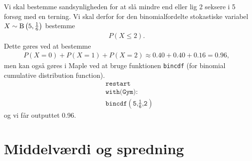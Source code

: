 \begin{exa}
	Vi skal bestemme sandsynligheden for at slå mindre end eller lig 2 seksere i 5 forsøg med en terning. Vi skal derfor for den binomialfordelte stokastiske variabel $X \sim 		
	\textnormal{B}\left(5,\frac{1}{6}\right)$ bestemme
	\begin{align*}
		P(X \leq 2).
	\end{align*}
	Dette gøres ved at bestemme 
	\begin{align*}
		P(X = 0) + P(X = 1) + P(X = 2) \approx 0.40 + 0.40 + 0.16 = 0.96,
	\end{align*}
	men kan også gøres i Maple ved at bruge funktionen \texttt{bincdf} (for binomial cumulative distribution function).
	\begin{align*}
		&\texttt{restart}\\
		&\texttt{with(Gym):}\\
		&\texttt{bincdf$\left(\texttt{5,$\frac{\texttt{1}}{\texttt{6}}$,2}\right)$}
	\end{align*}
	og vi får outputtet 0.96.
\end{exa}

\section*{Middelværdi og spredning}

